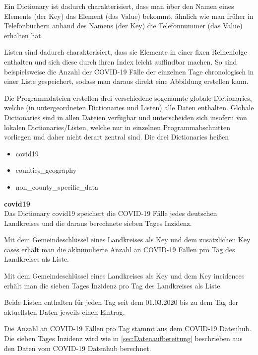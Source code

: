Ein Dictionary ist dadurch charakterisiert, dass man über den Namen eines Elements (der \glqq{}Key\grqq{}) das Element (das \glqq{}Value\grqq{})  bekommt, ähnlich wie man früher in Telefonbüchern anhand des Namens (der Key) die Telefonnummer (das Value) erhalten hat.

Listen sind dadurch charakterisiert, dass sie Elemente in einer fixen Reihenfolge enthalten und sich diese durch ihren Index leicht auffindbar machen. So sind beispielsweise die Anzahl der COVID-19 Fälle der einzelnen Tage chronologisch in einer Liste gespeichert, sodass man daraus direkt eine Abbildung erstellen kann.


Die Programmdateien erstellen drei verschiedene sogenannte globale Dictionaries, welche (in untergeordneten Dictionaries und Listen) alle Daten enthalten. Globale Dictionaries sind in allen Dateien verfügbar und unterscheiden sich insofern von lokalen Dictionaries/Listen, welche nur in einzelnen Programmabschnitten vorliegen und daher nicht derart zentral sind.
Die drei Dictionaries heißen
\begin{itemize}
    \item covid19
    \item counties\_geography
    \item non\_county\_specific\_data
\end{itemize}

\textbf{covid19}\\
Das Dictionary covid19 speichert die COVID-19 Fälle jedes deutschen Landkreises und die daraus berechnete sieben Tages Inzidenz.

Mit dem Gemeindeschlüssel eines Landkreises als Key und dem zusätzlichen Key \glqq{}cases\grqq{} erhält man die akkumulierte Anzahl an COVID-19 Fällen pro Tag des Landkreises als Liste.

Mit dem Gemeindeschlüssel eines Landkreises als Key und dem Key \glqq{}incidences\grqq{} erhält man die sieben Tages Inzidenz pro Tag des Landkreises als Liste.

Beide Listen enthalten für jeden Tag seit dem 01.03.2020 bis zu dem Tag der aktuellsten Daten jeweils einen Eintrag.

Die Anzahl an COVID-19 Fällen pro Tag stammt aus dem \glqq{}COVID-19 Datenhub\grqq{}. Die sieben Tages Inzidenz wird wie in \autoref{sec:Datenaufbereitung} beschrieben aus den Daten vom COVID-19 Datenhub berechnet.

